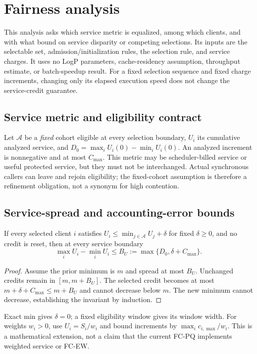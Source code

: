 \section{Fairness analysis}
\label{sec:fairness}
This analysis asks which service metric is equalized, among which clients,
and with what bound on service disparity or competing selections. Its inputs
are the selectable set, admission/initialization rules, the selection rule,
and service charges. It uses no LogP parameters, cache-residency assumption,
throughput estimate, or batch-speedup result. For a fixed selection sequence
and fixed charge increments, changing only its elapsed execution speed does
not change the service-credit guarantee.

\subsection{Service metric and eligibility contract}
Let $\mathcal A$ be a \emph{fixed} cohort eligible at every selection boundary,
$U_i$ its cumulative analyzed service, and $D_0=\max_i U_i(0)-\min_i U_i(0)$.
An analyzed increment is nonnegative and at most $C_{\max}$. This metric may
be scheduler-billed service or useful protected service, but they must not be
interchanged. Actual synchronous callers can leave and rejoin eligibility;
the fixed-cohort assumption is therefore a refinement obligation, not a
synonym for high contention.

\subsection{Service-spread and accounting-error bounds}
\begin{theorem}
\label{thm:spread}
If every selected client $i$ satisfies
$U_i\le\min_{j\in\mathcal A}U_j+\delta$ for fixed $\delta\ge0$, and no credit
is reset, then at every service boundary
\begin{equation}
 \max_i U_i-\min_i U_i\le B_U
   :=\max\{D_0,\delta+C_{\max}\}.\label{eq:spread}
\end{equation}
\end{theorem}
\begin{proof}
Assume the prior minimum is $m$ and spread at most $B_U$. Unchanged credits
remain in $[m,m+B_U]$. The selected credit becomes at most
$m+\delta+C_{\max}\le m+B_U$ and cannot decrease below $m$.
The new minimum cannot decrease, establishing the invariant by induction.
\end{proof}
Exact min gives $\delta=0$; a fixed eligibility window gives its window width.
For weights $w_i>0$, use $U_i=S_i/w_i$ and bound increments by
$\max_i c_{i,\max}/w_i$. This is a mathematical extension, not a claim that the
current FC-PQ implements weighted service or FC-EW.

